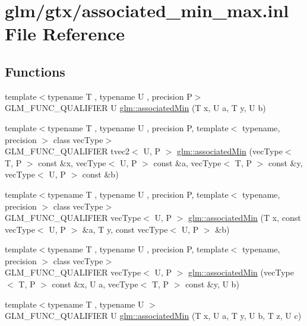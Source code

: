 \hypertarget{associated__min__max_8inl}{\section{glm/gtx/associated\-\_\-min\-\_\-max.inl File Reference}
\label{associated__min__max_8inl}
}
\subsection*{Functions}
\begin{DoxyCompactItemize}
\item 
{\footnotesize template$<$typename T , typename U , precision P$>$ }\\G\-L\-M\-\_\-\-F\-U\-N\-C\-\_\-\-Q\-U\-A\-L\-I\-F\-I\-E\-R U \hyperlink{group__gtx__associated__min__max_gacc01bd272359572fc28437ae214a02df}{glm\-::associated\-Min} (T x, U a, T y, U b)
\item 
{\footnotesize template$<$typename T , typename U , precision P, template$<$ typename, precision $>$ class vec\-Type$>$ }\\G\-L\-M\-\_\-\-F\-U\-N\-C\-\_\-\-Q\-U\-A\-L\-I\-F\-I\-E\-R tvec2$<$ U, P $>$ \hyperlink{group__gtx__associated__min__max_ga8b538d10872626668a078e2bd495af25}{glm\-::associated\-Min} (vec\-Type$<$ T, P $>$ const \&x, vec\-Type$<$ U, P $>$ const \&a, vec\-Type$<$ T, P $>$ const \&y, vec\-Type$<$ U, P $>$ const \&b)
\item 
{\footnotesize template$<$typename T , typename U , precision P, template$<$ typename, precision $>$ class vec\-Type$>$ }\\G\-L\-M\-\_\-\-F\-U\-N\-C\-\_\-\-Q\-U\-A\-L\-I\-F\-I\-E\-R vec\-Type$<$ U, P $>$ \hyperlink{group__gtx__associated__min__max_ga1dccff48fa5650c746533de83467da6e}{glm\-::associated\-Min} (T x, const vec\-Type$<$ U, P $>$ \&a, T y, const vec\-Type$<$ U, P $>$ \&b)
\item 
{\footnotesize template$<$typename T , typename U , precision P, template$<$ typename, precision $>$ class vec\-Type$>$ }\\G\-L\-M\-\_\-\-F\-U\-N\-C\-\_\-\-Q\-U\-A\-L\-I\-F\-I\-E\-R vec\-Type$<$ U, P $>$ \hyperlink{group__gtx__associated__min__max_ga076717f4e07c6ae725cc1382d1ac4869}{glm\-::associated\-Min} (vec\-Type$<$ T, P $>$ const \&x, U a, vec\-Type$<$ T, P $>$ const \&y, U b)
\item 
{\footnotesize template$<$typename T , typename U $>$ }\\G\-L\-M\-\_\-\-F\-U\-N\-C\-\_\-\-Q\-U\-A\-L\-I\-F\-I\-E\-R U \hyperlink{group__gtx__associated__min__max_gad0aa8f86259a26d839d34a3577a923fc}{glm\-::associated\-Min} (T x, U a, T y, U b, T z, U c)

\end{DoxyCompactItemize}
